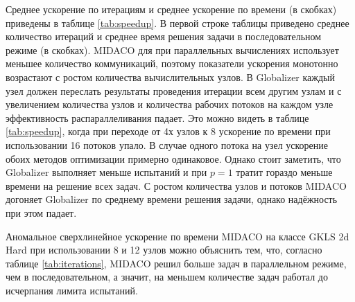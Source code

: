 \documentclass{svproc}
\begin{document}
\begin{Russian}
Среднее ускорение по итерациям и среднее ускорение по времени (в скобках) приведены в таблице \ref{tab:speedup}.
В первой строке таблицы приведено среднее количество итераций и среднее время решения задачи в
последовательном режиме (в скобках). MIDACO для при параллельных вычислениях использует
меньшее количество коммуникаций, поэтому показатели ускорения монотонно возрастают с ростом количества
вычислительных узлов. В Globalizer каждый узел должен переслать результаты проведения итерации
всем другим узлам и с увеличением количества узлов и количества рабочих потоков на каждом узле
эффективность распараллеливания падает. Это можно видеть в таблице \ref{tab:speedup}, когда при переходе от 4х
узлов к 8 ускорение по времени при использовании 16 потоков упало. В случае одного потока на узел
ускорение обоих методов оптимизации примерно одинаковое. Однако стоит заметить, что Globalizer выполняет
меньше испытаний и при \(p=1\) тратит гораздо меньше времени на решение всех задач.
С ростом количества узлов и потоков MIDACO догоняет Globalizer по среднему времени решения задачи,
однако надёжность при этом падает.

Аномальное сверхлинейное ускорение по времени
MIDACO на классе GKLS 2d Hard при использовании 8 и 12 узлов можно объяснить тем, что, согласно таблице
\ref{tab:iterations}, MIDACO решил больше задач в параллельном режиме, чем в последовательном, а значит, на
меньшем количестве задач работал до исчерпания лимита испытаний.


\end{Russian}
\end{document}
